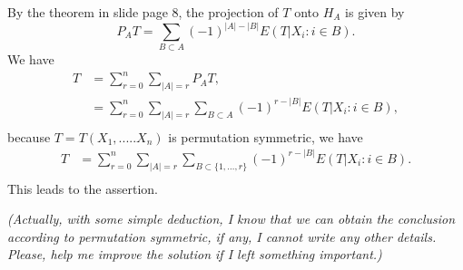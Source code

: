 \begin{solution}
    By the theorem in slide page 8, the projection of $T$ onto $H_{A}$ is given by
    \begin{equation*}
        P_{A} T = \sum_{B \subset A} (-1)^{|A|-|B|} E\left(T | X_{i}: i \in B\right).
    \end{equation*}
    We have 
    \begin{equation*}
        \begin{split}
            T & = \sum_{r=0}^n \sum_{|A|=r} P_{A} T ,\\
            & =  \sum_{r=0}^n \sum_{|A|=r} \sum_{B\subset A} (-1)^{r-|B|} E\left(T | X_{i}: i \in B\right) ,\\
        \end{split}
    \end{equation*}
    because $T = T (X_1, . . . ..X_n)$ is permutation symmetric, we have
    \begin{equation*}
        \begin{split}
            T 
            & =  \sum_{r=0}^n \sum_{|A|=r} \sum_{B\subset \{1,\dots,r\}} (-1)^{r-|B|} E\left(T | X_{i}: i \in B\right). \\
        \end{split}
    \end{equation*}
    This leads to the assertion.

    \emph{(Actually, with some simple deduction, I know that we can obtain the conclusion according to permutation symmetric, if any, I cannot write any other details. Please, help me improve the solution if I left something important.)}
\end{solution}




